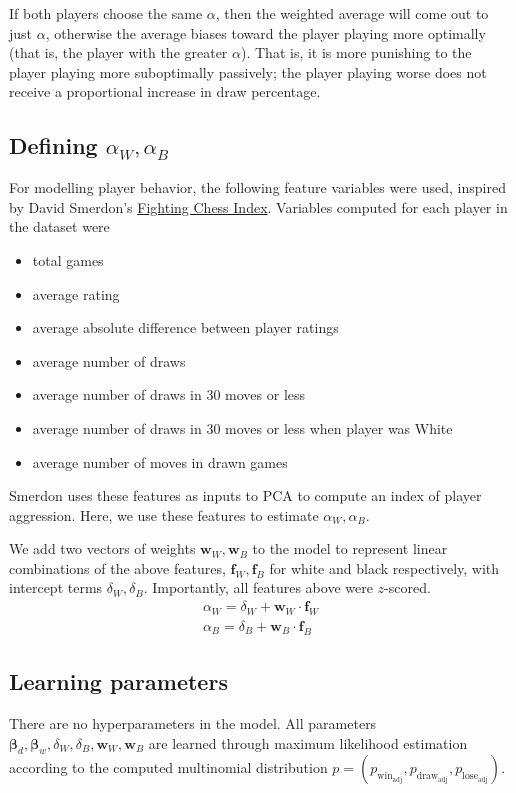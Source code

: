 \documentclass{article}
\begin{document}
If both players choose the same $\alpha$, then the weighted average
will come out to just $\alpha$, otherwise the average biases toward
the player playing more optimally (that is, the player with the greater $\alpha$).
That is, it is more punishing to the player playing more suboptimally passively; the
player playing worse does not receive a proportional increase in draw percentage.

\subsection{Defining $\alpha_W,\alpha_B$}
For modelling player behavior, the following feature variables were used, inspired by David Smerdon's
\href{https://www.davidsmerdon.com/?p=2168}{Fighting Chess Index}.
Variables computed for each player in the dataset were
\begin{itemize}
    \item total games
    \item average rating
    \item average absolute difference between player ratings
    \item average number of draws
    \item average number of draws in 30 moves or less
    \item average number of draws in 30 moves or less when player was White
    \item average number of moves in drawn games
\end{itemize}
Smerdon uses these features as inputs to PCA to compute an index of player aggression.
Here, we use these features to estimate $\alpha_W, \alpha_B$.

We add two vectors of weights $\bm{w}_W,\bm{w}_B$ to the model to represent
linear combinations of the above features, $\bm{f}_W,\bm{f}_B$ for white and black respectively, with
intercept terms $\delta_W,\delta_B$.
Importantly, all features above were $z$-scored.
\begin{gather*}
    \alpha_W=\delta_W + \bm{w}_W\cdot \bm{f}_W \\
    \alpha_B=\delta_B + \bm{w}_B\cdot \bm{f}_B
\end{gather*}

\subsection{Learning parameters}
There are no hyperparameters in the model. All parameters
$\bm{\beta}_d,\bm{\beta}_w, \delta_W, \delta_B,\bm{w}_W,\bm{w}_B$ are learned through maximum likelihood estimation
according to the computed multinomial distribution
$p=(p_{\text{win}_{\text{adj}}},p_{\text{draw}_{\text{adj}}},p_{\text{lose}_{\text{adj}}})$.
\end{document}
